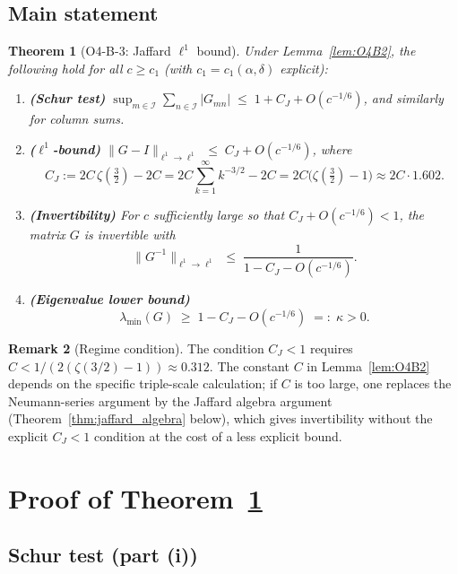 \documentclass[12pt,a4paper]{amsart}
\newtheorem{theorem}{Theorem}[section]
\theoremstyle{definition}
\newtheorem{remark}[theorem]{Remark}
\newcommand{\lmin}{\lambda_{\min}}
\newcommand{\CJ}{C_J}
\newcommand{\normone}[1]{\lVert #1 \rVert_{\ell^1\to\ell^1}}
\newcommand{\abs}[1]{\lvert #1 \rvert}
\begin{document}
\subsection{Main statement}

\begin{theorem}[O4-B-3: Jaffard $\ell^1$ bound]
\label{thm:jaffard}
Under Lemma~\ref{lem:O4B2}, the following hold for all $c \ge c_1$
(with $c_1 = c_1(\alpha,\delta)$ explicit):
\begin{enumerate}[label=(\roman*)]
  \item \textbf{(Schur test)} $\displaystyle\sup_{m \in \mathcal{I}}
    \sum_{n \in \mathcal{I}} \abs{G_{mn}} \;\le\; 1 + \CJ + O(c^{-1/6})$,
    and similarly for column sums.
  \item \textbf{($\ell^1$-bound)} $\normone{G - I} \;\le\; \CJ + O(c^{-1/6})$,
    where
    \[
      \CJ := 2C\,\zeta\!\left(\tfrac{3}{2}\right) - 2C
            = 2C\sum_{k=1}^{\infty} k^{-3/2} - 2C
            = 2C\bigl(\zeta(\tfrac{3}{2})-1\bigr) \approx 2C\cdot 1.602.
    \]
  \item \textbf{(Invertibility)} For $c$ sufficiently large so that
    $\CJ + O(c^{-1/6}) < 1$, the matrix $G$ is invertible with
    \[
      \normone{G^{-1}} \;\le\; \frac{1}{1 - \CJ - O(c^{-1/6})}.
    \]
  \item \textbf{(Eigenvalue lower bound)} 
    \[
      \lmin(G) \;\ge\; 1 - \CJ - O(c^{-1/6}) \;=:\; \kappa > 0.
    \]
\end{enumerate}
\end{theorem}

\begin{remark}[Regime condition]
The condition $\CJ < 1$ requires $C < 1/(2(\zeta(3/2)-1)) \approx 0.312$.
The constant $C$ in Lemma~\ref{lem:O4B2} depends on the specific
triple-scale calculation; if $C$ is too large, one replaces the
Neumann-series argument by the Jaffard algebra argument
(Theorem~\ref{thm:jaffard_algebra} below), which gives invertibility
without the explicit $\CJ < 1$ condition at the cost of a less explicit bound.
\end{remark}

\section{Proof of Theorem~\ref{thm:jaffard}}
\label{sec:proof}

\subsection{Schur test (part (i))}
\end{document}
